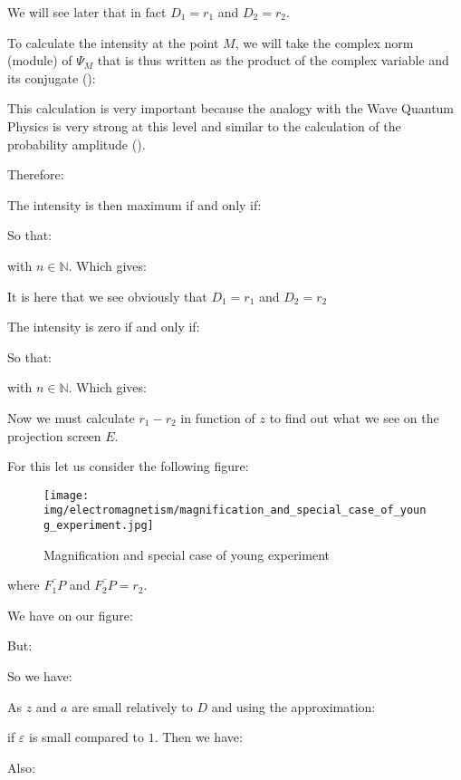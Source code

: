	\begin{tcolorbox}[title=Remark,colframe=black,arc=10pt]
	We will see later that in fact $D_1=r_1$ and $D_2=r_2$.
	\end{tcolorbox}
	To calculate the intensity at the point $M$, we will take the complex norm (module) of $\Psi_M$ that is thus written as the product of the complex variable and its conjugate ():
	
	\begin{tcolorbox}[title=Remark,colframe=black,arc=10pt]
	This calculation is very important because the analogy with the Wave Quantum Physics is very strong at this level and similar to the calculation of the probability amplitude ().
	\end{tcolorbox}
	Therefore:
	
	The intensity is then maximum if and only if:
	
	So that:
	
	with $n\in\mathbb{N}$. Which gives:
	
	\begin{tcolorbox}[title=Remark,colframe=black,arc=10pt]
	It is here that we see obviously that $D_1=r_1$ and $D_2=r_2$
	\end{tcolorbox}
	The intensity is zero if and only if:
	
	So that:
	
	with $n\in\mathbb{N}$. Which gives:
	
	Now we must calculate $r_1-r_2$ in function of $z$ to find out what we see on the projection screen $E$.
	
	For this let us consider the following figure:
	\begin{figure}[H]
		\centering
		\texttt{[image: img/electromagnetism/magnification\_and\_special\_case\_of\_young\_experiment.jpg]}
		\caption[]{Magnification and special case of young experiment}
	\end{figure}
	where $\overline{F_1P}$ and $\overline{F_2P}=r_2$.
	
	We have on our figure:
	
	But:
	
	So we have:
	
	As $z$ and $a$ are small relatively to $D$ and using the approximation:
	
	if $\varepsilon$ is small compared to $1$. Then we have:
	
	Also:
	
